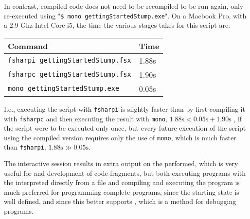 In contrast, compiled code does not need to be recompiled to be run again, only re-executed using "\lstinline[language=console]{$ mono gettingStartedStump.exe}".%
On a Macbook Pro, with a 2.9 Ghz Intel Core i5, the time the various stages takes for this script are:
\begin{center}
  \begin{tabular}{|l|l|}
    \hline
    \rowcolor{headerRowColor} Command & Time\\
    \hline
    \lstinline[language=console]|fsharpi gettingStartedStump.fsx| & 1.88s\\
    \lstinline[language=console]|fsharpc gettingStartedStump.fsx| & 1.90s\\
    \lstinline[language=console]|mono gettingStartedStump.exe| & 0.05s\\
    \hline
\end{tabular}
\end{center}
I.e., executing the script with \lstinline[language=console]|fsharpi| is slightly faster than by first compiling it with \lstinline[language=console]|fsharpc| and then executing the result with \lstinline[language=console]|mono|, $1.88\text{s} < 0.05\text{s}+1.90\text{s}$ , if the script were to be executed only once, but every future execution of the script using the compiled version requires only the use of \lstinline[language=console]|mono|, which is much faster than \lstinline[language=console]|fsharpi|, $1.88\text{s}\gg 0.05\text{s}$.

The interactive session results in extra output on the  performed, which is very useful for  and development of code-fragments, but both executing programs with the interpreted directly from a file and compiling and executing the program is much preferred for programming complete programs, since the starting state is well defined, and since this better supports , which is a method for debugging programs.

